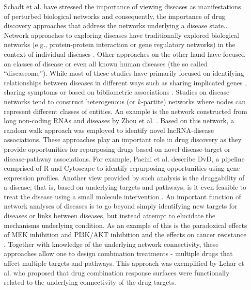 \documentclass[]{book}
\begin{document}
Schadt et al. \cite{Schadt:2009zl} have stressed the importance of
viewing diseases as manifestations of perturbed biological networks
and consequently, the importance of drug discovery approaches that
address the networks underlying a disease state.. Network approaches
to exploring diseases have traditionally explored biological networks
(e.g., protein-protein interaction or gene regulatory networks) in the
context of individual diseases \cite{Lim:2006fe,
  Altieri:2008aa}. Other approaches on the other hand have focused on
classes of disease \cite{Zhang:2013tx} or even all known human
diseases \cite{Goh:2007aa} (the so called ``diseaseome''). While most
of these studies have primarily focused on identifying relationships
between diseases in different ways such as sharing implicated genes
\cite{Bauer-Mehren:2011tv,Goh:2007aa}, sharing symptoms
\cite{Zhou:2014qp} or based on bibliometric associations
\cite{Zhang:2014sh}. Studies on disease networks tend to construct
heterogenous (or $k$-partite) networks where nodes can represent
different classes of entities. An example is the network constructed
from long non-coding RNAs and diseases by Zhou et al. 
\cite{Zhou:2015if}. Based on this network, a random walk approach was
employed to identify novel lncRNA-disease associations. These
approaches play an important role in drug discovery as they provide
opportunities for repurposing drugs based on novel disease-target or
disease-pathway associations. For example, Pacini et al. 
\cite{Pacini:2013kl} describe DvD, a pipeline comprised of R and
Cytoscape \cite{Shannon:2003aa} to identify repurposing opportunities
using gene expression profiles. Another view provided by such analysis
is the druggability of a disease; that is, based on underlying targets
and pathways, is it even feasible to treat the disease using a small
molecule intervention \cite{Boran:2010fk}. An important function of
network analyses of diseases is to go beyond simply identifying new
targets for diseases or links between diseases, but instead attempt to
elucidate the mechanisms underlying condition. As an example of this
is the paradoxical effects of MEK inhibition and PI3K/AKT inhibition
and the effects on cancer resistance \cite{Sos:2009gc}. Together with
knowledge of the underlying network connectivity, these approaches
allow one to design combination treatments - multiple drugs that
affect multiple targets and pathways. This approach was exemplified by
Lehar et al. \cite{Lehar:2009gu} who proposed that drug combination
response surfaces were functionally related to the underlying
connectivity of the drug targets.
\end{document}
